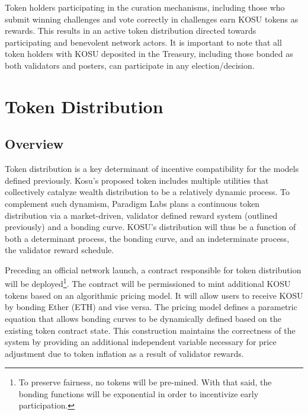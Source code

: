 \documentclass[10pt]{article}
\begin{document}
Token holders participating in the curation mechanisms, including those who submit winning challenges and vote correctly in challenges earn KOSU tokens as rewards. This results in an active token distribution directed towards participating and benevolent network actors. It is important to note that all token holders with KOSU deposited in the Treasury, including those bonded as both validators and posters, can participate in any election/decision.

\clearpage
\pagebreak


\section{Token Distribution}\label{token-distribution}

\subsection{Overview}\label{token-distribution-overview}
Token distribution is a key determinant of incentive compatibility for the models defined previously. Kosu’s proposed token includes multiple utilities that collectively catalyze wealth distribution to be a relatively dynamic process. To complement such dynamism, Paradigm Labs plans a continuous token distribution via a market-driven, validator defined reward system (outlined previously) and a bonding curve. KOSU’s distribution will thus be a function of both a determinant process, the bonding curve, and an indeterminate process, the validator reward schedule.
\medskip

Preceding an official network launch, a contract responsible for token distribution will be deployed\footnote{To preserve fairness, no tokens will be pre-mined. With that said, the bonding functions will be exponential in order to incentivize early participation.}. The contract will be permissioned to mint additional KOSU tokens based on an algorithmic pricing model. It will allow users to receive KOSU by bonding Ether (ETH) and vise versa. The pricing model defines a parametric equation that allows bonding curves to be dynamically defined based on the existing token contract state. This construction maintains the correctness of the system by providing an additional independent variable necessary for price adjustment due to token inflation as a result of validator rewards.
\end{document}
